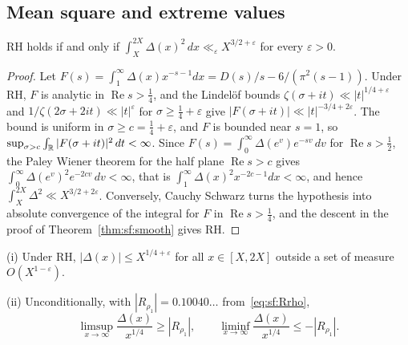 \subsection{Mean square and extreme values}

\begin{theorem}\label{thm:sf:meansq}
RH holds if and only if $\int_X^{2X}\Delta(x)^2\,dx\ll_\varepsilon X^{3/2+\varepsilon}$ for every $\varepsilon>0$.
\end{theorem}

\begin{proof}
Let $F(s)=\int_1^\infty\Delta(x)x^{-s-1}dx=D(s)/s-6/(\pi^2(s-1))$. Under RH, $F$ is analytic in $\operatorname{Re} s>\frac14$, and the Lindel\"of bounds $\zeta(\sigma+it)\ll|t|^{1/4+\varepsilon}$ and $1/\zeta(2\sigma+2it)\ll|t|^\varepsilon$ for $\sigma\ge\frac14+\varepsilon$ give $|F(\sigma+it)|\ll|t|^{-3/4+2\varepsilon}$. The bound is uniform in $\sigma\ge c=\frac14+\varepsilon$, and $F$ is bounded near $s=1$, so $\sup_{\sigma>c}\int_{\mathbb{R}}|F(\sigma+it)|^2\,dt<\infty$. Since $F(s)=\int_0^\infty\Delta(e^v)e^{-sv}\,dv$ for $\operatorname{Re}s>\frac12$, the Paley Wiener theorem for the half plane $\operatorname{Re}s>c$ gives $\int_0^\infty\Delta(e^v)^2e^{-2cv}\,dv<\infty$, that is $\int_1^\infty\Delta(x)^2x^{-2c-1}dx<\infty$, and hence $\int_X^{2X}\Delta^2\ll X^{3/2+2\varepsilon}$. Conversely, Cauchy Schwarz turns the hypothesis into absolute convergence of the integral for $F$ in $\operatorname{Re} s>\frac14$, and the descent in the proof of Theorem~\ref{thm:sf:smooth} gives RH.
\end{proof}

\begin{corollary}\label{cor:sf:omega}
(i) Under RH, $|\Delta(x)|\le X^{1/4+\varepsilon}$ for all $x\in[X,2X]$ outside a set of measure $O(X^{1-\varepsilon})$.

(ii) Unconditionally, with $|R_{\rho_1}|=0.10040\ldots$ from~\eqref{eq:sf:Rrho},
\[
\limsup_{x\to\infty}\frac{\Delta(x)}{x^{1/4}}\ge|R_{\rho_1}|,\qquad\liminf_{x\to\infty}\frac{\Delta(x)}{x^{1/4}}\le-|R_{\rho_1}| .
\]
\end{corollary}

